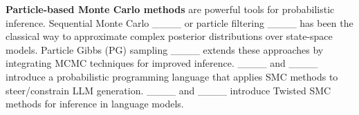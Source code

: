 \textbf{Particle-based Monte Carlo methods} are powerful tools for probabilistic inference. Sequential Monte Carlo ____ or particle filtering ____ has been the classical way to approximate complex posterior distributions over state-space models. Particle Gibbs (PG) sampling ____ extends these approaches by integrating MCMC techniques for improved inference. ____ and ____ introduce a probabilistic programming language that applies SMC methods to steer/constrain LLM generation. ____ and ____ introduce Twisted SMC methods for inference in language models. 







